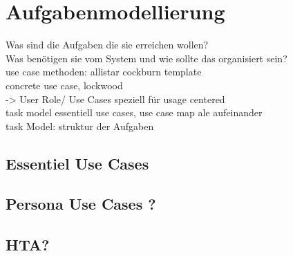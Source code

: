 
\section{Aufgabenmodellierung}

Was sind die Aufgaben die sie erreichen wollen?\\
Was benötigen sie vom System und wie sollte das organisiert sein?\\

use case methoden: allistar cockburn template \\
concrete use case, lockwood\\


-> User Role/ Use Cases speziell für usage centered	\\
task model essentiell use cases, use case map ale aufeinander\\

task Model: struktur der Aufgaben\\


\subsection{Essentiel Use Cases}
\subsection{Persona Use Cases ?}
\subsection{HTA?}